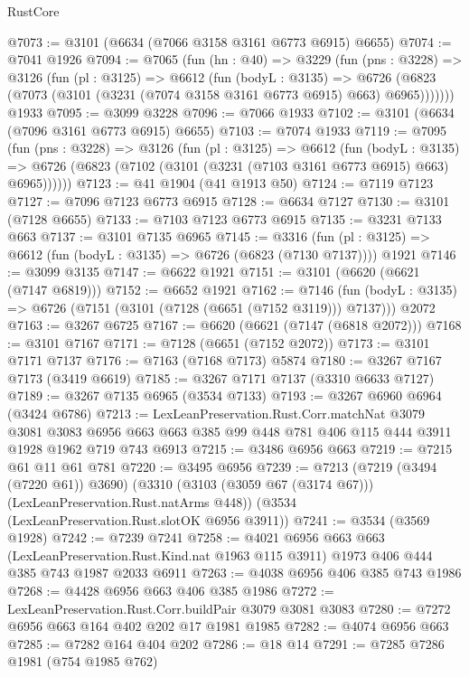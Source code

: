 \begin{lexlean}{RustCore}
\begin{coremodule}
@7073 := @3101 (@6634 (@7066 @3158 @3161 @6773 @6915) @6655)
@7074 := @7041 @1926
@7094 := @7065
    (fun (hn : @40) =>
    @3229
      (fun (pns : @3228) =>
      @3126
        (fun (pl : @3125) =>
        @6612
          (fun (bodyL : @3135) =>
          @6726 (@6823 (@7073 (@3101 (@3231 (@7074 @3158 @3161 @6773 @6915) @663) @6965)))))))
    @1933
@7095 := @3099 @3228
@7096 := @7066 @1933
@7102 := @3101 (@6634 (@7096 @3161 @6773 @6915) @6655)
@7103 := @7074 @1933
@7119 := @7095
    (fun (pns : @3228) =>
    @3126
      (fun (pl : @3125) =>
      @6612
        (fun (bodyL : @3135) =>
        @6726 (@6823 (@7102 (@3101 (@3231 (@7103 @3161 @6773 @6915) @663) @6965))))))
@7123 := @41 @1904 (@41 @1913 @50)
@7124 := @7119 @7123
@7127 := @7096 @7123 @6773 @6915
@7128 := @6634 @7127
@7130 := @3101 (@7128 @6655)
@7133 := @7103 @7123 @6773 @6915
@7135 := @3231 @7133 @663
@7137 := @3101 @7135 @6965
@7145 := @3316
    (fun (pl : @3125) => @6612 (fun (bodyL : @3135) => @6726 (@6823 (@7130 @7137))))
    @1921
@7146 := @3099 @3135
@7147 := @6622 @1921
@7151 := @3101 (@6620 (@6621 (@7147 @6819)))
@7152 := @6652 @1921
@7162 := @7146
    (fun (bodyL : @3135) => @6726 (@7151 (@3101 (@7128 (@6651 (@7152 @3119))) @7137)))
    @2072
@7163 := @3267 @6725
@7167 := @6620 (@6621 (@7147 (@6818 @2072)))
@7168 := @3101 @7167
@7171 := @7128 (@6651 (@7152 @2072))
@7173 := @3101 @7171 @7137
@7176 := @7163 (@7168 @7173) @5874
@7180 := @3267 @7167 @7173 (@3419 @6619)
@7185 := @3267 @7171 @7137 (@3310 @6633 @7127)
@7189 := @3267 @7135 @6965 (@3534 @7133)
@7193 := @3267 @6960 @6964 (@3424 @6786)
@7213 := LexLeanPreservation.Rust.Corr.matchNat
    @3079
    @3081
    @3083
    @6956
    @663
    @663
    @385
    @99
    @448
    @781
    @406
    @115
    @444
    @3911
    @1928
    @1962
    @719
    @743
    @6913
@7215 := @3486 @6956 @663
@7219 := @7215 @61 @11 @61 @781
@7220 := @3495 @6956
@7239 := @7213
    (@7219 (@3494 (@7220 @61)) @3690)
    (@3310 (@3103 (@3059 @67 (@3174 @67))) (LexLeanPreservation.Rust.natArms @448))
    (@3534 (LexLeanPreservation.Rust.slotOK @6956 @3911))
@7241 := @3534 (@3569 @1928)
@7242 := @7239 @7241
@7258 := @4021
    @6956
    @663
    @663
    (LexLeanPreservation.Rust.Kind.nat @1963 @115 @3911)
    @1973
    @406
    @444
    @385
    @743
    @1987
    @2033
    @6911
@7263 := @4038 @6956 @406 @385 @743 @1986
@7268 := @4428 @6956 @663 @406 @385 @1986
@7272 := LexLeanPreservation.Rust.Corr.buildPair @3079 @3081 @3083
@7280 := @7272 @6956 @663 @164 @402 @202 @17 @1981 @1985
@7282 := @4074 @6956 @663
@7285 := @7282 @164 @404 @202
@7286 := @18 @14
@7291 := @7285 @7286 @1981 (@754 @1985 @762)

\end{coremodule}
\end{lexlean}
